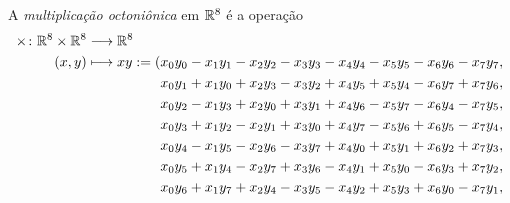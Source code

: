 \begin{definition}
A \emph{multiplicação octoniônica} em $\mathbb{R}^8$ é a operação
	\begin{align*}
	\func{\times}{\R^8 \times \R^8}{\R^8}{(x,y)}{
		\begin{aligned}[t]
		xy := (&x_0y_0 - x_1y_1 - x_2y_2 - x_3y_3 - x_4y_4 - x_5y_5 - x_6y_6 - x_7y_7, \\
				&x_0y_1 + x_1y_0 + x_2y_3 - x_3y_2 + x_4y_5 + x_5y_4 - x_6y_7 + x_7y_6, \\
				&x_0y_2 - x_1y_3 + x_2y_0 + x_3y_1 + x_4y_6 - x_5y_7 - x_6y_4 - x_7y_5, \\
				&x_0y_3 + x_1y_2 - x_2y_1 + x_3y_0 + x_4y_7 - x_5y_6 + x_6y_5 - x_7y_4, \\
				&x_0y_4 - x_1y_5 - x_2y_6 - x_3y_7 + x_4y_0 + x_5y_1 + x_6y_2 + x_7y_3, \\
				&x_0y_5 + x_1y_4 - x_2y_7 + x_3y_6 - x_4y_1 + x_5y_0 - x_6y_3 + x_7y_2, \\
				&x_0y_6 + x_1y_7 + x_2y_4 - x_3y_5 - x_4y_2 + x_5y_3 + x_6y_0 - x_7y_1, \\

\end{aligned}}
\end{align*}
\end{definition}
